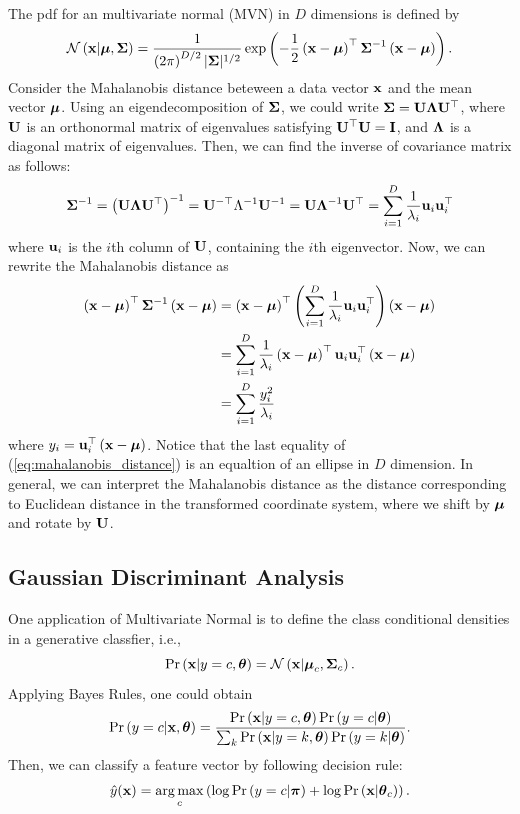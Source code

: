 \documentclass{article}
\begin{document}
The pdf for an multivariate normal (MVN) in $D$ dimensions is defined by
\begin{equation}
  \label{eq:multivariate_normal}
  \mathcal{N}\left( {\mathbf{x}} | \hbox{\boldmath$\mu$}, \hbox{\boldmath$\Sigma$} \right) = \frac{1}{\left( 2\pi \right)^{D/2}|\hbox{\boldmath$\Sigma$}|^{1/2}} \exp\left( -\frac{1}{2}\left( {\mathbf{x}} - \hbox{\boldmath$\mu$} \right)^\top \hbox{\boldmath$\Sigma$}^{-1} \left( {\mathbf{x}} - \hbox{\boldmath$\mu$} \right) \right).
\end{equation}
Consider the Mahalanobis distance beteween a data vector ${\mathbf{x}}$ and the mean vector $\hbox{\boldmath$\mu$}$. Using an eigendecomposition of $\hbox{\boldmath$\Sigma$}$, we could write $\hbox{\boldmath$\Sigma$} = {\mathbf{U}}\hbox{\boldmath$\Lambda$} {\mathbf{U}}^\top$, where ${\mathbf{U}}$ is an orthonormal matrix of eigenvalues satisfying ${\mathbf{U}}^\top {\mathbf{U}} = {\mathbf{I}}$, and $\hbox{\boldmath$\Lambda$}$ is a diagonal matrix of eigenvalues. Then, we can find the inverse of covariance matrix as follows:
\begin{equation}
  \hbox{\boldmath$\Sigma$}^{-1} = \left( {\mathbf{U}} \hbox{\boldmath$\Lambda$} {\mathbf{U}}^\top \right)^{-1} = {\mathbf{U}}^{-\top}\Lambda^{-1} {\mathbf{U}}^{-1} = {\mathbf{U}} \hbox{\boldmath$\Lambda$}^{-1} {\mathbf{U}}^\top = \sum_{i=1}^{D}\frac{1}{\lambda_i}{\mathbf{u}}_i {\mathbf{u}}_i^\top
\end{equation}
where ${\mathbf{u}}_i$ is the $i$th column of ${\mathbf{U}}$, containing the $i$th eigenvector. Now, we can rewrite the Mahalanobis distance as
\begin{equation}
  \label{eq:mahalanobis_distance}
  \begin{split}
    \left( {\mathbf{x}} - \hbox{\boldmath$\mu$} \right)^\top \hbox{\boldmath$\Sigma$}^{-1} \left( {\mathbf{x}} - \hbox{\boldmath$\mu$} \right) &= \left( {\mathbf{x}} - \hbox{\boldmath$\mu$} \right)^\top \left( \sum_{i=1}^{D} \frac{1}{\lambda_i}{\mathbf{u}}_i {\mathbf{u}}_i^\top  \right) \left( {\mathbf{x}} - \hbox{\boldmath$\mu$} \right) \\
    &= \sum_{i=1}^{D}\frac{1}{\lambda_i} \left( {\mathbf{x}} - \hbox{\boldmath$\mu$} \right)^\top {\mathbf{u}}_i {\mathbf{u}}_i^\top \left( {\mathbf{x}} - \hbox{\boldmath$\mu$} \right) \\
    &= \sum_{i=1}^{D} \frac{y_i^2}{\lambda_i}
  \end{split}
\end{equation}
where $y_i = {\mathbf{u}}_i^\top \left( {\mathbf{x}} - \hbox{\boldmath$\mu$} \right)$. Notice that the last equality of (\ref{eq:mahalanobis_distance}) is an equaltion of an ellipse in $D$ dimension. In general, we can interpret the Mahalanobis distance as the distance corresponding to Euclidean distance in the transformed coordinate system, where we shift by $\hbox{\boldmath$\mu$}$ and rotate by ${\mathbf{U}}$.

\subsection{Gaussian Discriminant Analysis}
One application of Multivariate Normal is to define the class conditional densities in a generative classfier, i.e.,
\begin{equation}
  \text{Pr}\left( {\mathbf{x}} | y = c, \hbox{\boldmath$\theta$} \right) = \mathcal{N}\left( {\mathbf{x}} | \hbox{\boldmath$\mu$}_c, \hbox{\boldmath$\Sigma$}_c \right).
\end{equation}
Applying Bayes Rules, one could obtain
\begin{equation}
  \text{Pr}\left( y = c | {\mathbf{x}}, \hbox{\boldmath$\theta$} \right) = \frac{\text{Pr}\left( {\mathbf{x}} | y = c, \hbox{\boldmath$\theta$} \right)\text{Pr}\left( y = c | \hbox{\boldmath$\theta$} \right)}{\sum_{k}\text{Pr}\left( {\mathbf{x}} | y = k, \hbox{\boldmath$\theta$} \right)\text{Pr}\left( y = k | \hbox{\boldmath$\theta$} \right)}.
\end{equation}
Then, we can classify a feature vector by following decision rule:
\begin{equation}
  \label{eq:gda_rule}
  \hat{y}({\mathbf{x}}) = \operatorname*{arg\,max}_c \left(  \log \text{Pr}\left( y = c | \hbox{\boldmath$\pi$} \right) + \log \text{Pr}\left( {\mathbf{x}} | \hbox{\boldmath$\theta$}_c \right) \right).
\end{equation}
\end{document}
